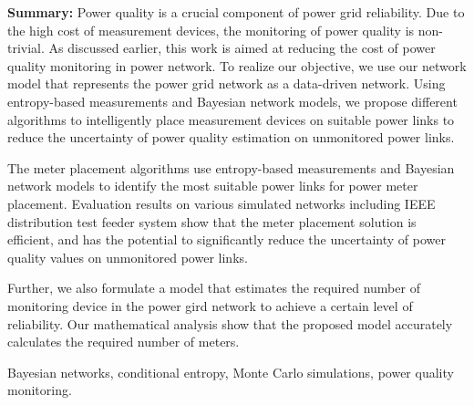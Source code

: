 \label{chap:meterPlacement}

\small
\textbf{Summary:} Power quality is a crucial component of power grid reliability. Due to the high cost of measurement devices, the monitoring of power quality is non-trivial. As discussed earlier, this work is aimed at reducing the cost of power quality monitoring in power network. To realize our objective, we use our network model that represents the power grid network as a data-driven network. Using entropy-based measurements and Bayesian network models, we propose different algorithms to intelligently place measurement devices on suitable power links to reduce the uncertainty of power quality estimation on unmonitored power links.

The meter placement algorithms use entropy-based measurements and Bayesian network models to identify the most suitable power links for power meter placement. Evaluation results on various simulated networks including IEEE distribution test feeder system show that the meter placement solution is efficient, and has the potential to significantly reduce the uncertainty of power quality values on unmonitored power links.

Further, we also formulate a model that estimates the required number of monitoring device in the power gird network to achieve a certain level of reliability. Our mathematical analysis show that the proposed model accurately calculates the required number of meters.

\vspace{0.25in}
\begin{keywords} Bayesian networks, conditional entropy, Monte Carlo simulations, power quality monitoring. \end{keywords}
\vspace{-0.1in}

\small
\setlength{\nomitemsep}{-0.1em}
\printnomenclature

